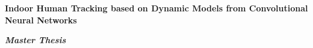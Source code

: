 
\begin{titlepage}
\label{sec:title}

\large 
\begin{center}

\vspace{3cm}
\begin{figure}[ht]
\centering%
\hspace{20pt}
\end{figure}

\vspace{2cm}

\begin{minipage}{.9\linewidth}
{\centering\Huge\bf Indoor Human Tracking based on Dynamic Models from Convolutional Neural Networks \par} 
\end{minipage}

\large 


\vspace{1.5cm}
{\huge{\bf \it Master Thesis} %
}


\end{center}
\end{titlepage}
